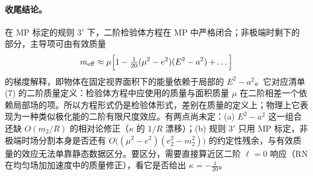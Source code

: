 \documentclass[11pt,a4paper]{ctexart}
\numberwithin{equation}{section}
\begin{document}
\paragraph{收尾结论。}在 MP 标定的规则 3$'$ 下，二阶检验体方程在 MP 中严格闭合；非极端时剩下的部分，主导项可由有效质量
\begin{equation*}
m_{\rm eff}\approx\mu\Big[1-\tfrac1{20}(\mu^2-e^2)(E^2-a^2)+\dots\Big]
\end{equation*}
的梯度解释，即物体在固定视界面积下的能量依赖于局部的 $E^2-a^2$。它对应清单 (7) 的二阶质量定义：检验体方程中应使用的质量与面积质量 $\mu$ 在二阶相差一个依赖局部场的项。所以方程形式仍是检验体形式，差别在质量的定义上；物理上它表现为一种类似极化能的二阶有限尺度效应。有两点尚未定：(a) $E^2-a^2$ 这一组合还缺 $O(m_2/R)$ 的相对论修正（$\kappa$ 的 $1/R$ 漂移）；(b) 规则 3$'$ 只用 MP 标定，非极端时场分割本身是否还有 $O\big((\mu^2-e^2)(e_2^2-m_2^2)\big)$ 的约定性残余，与有效质量的效应无法单靠静态数据区分。要区分，需要直接算近区二阶 $\ell=0$ 响应（RN 在均匀场加加速度中的质量修正），看它是否给出 $\kappa=-\tfrac1{20}$。
\end{document}
